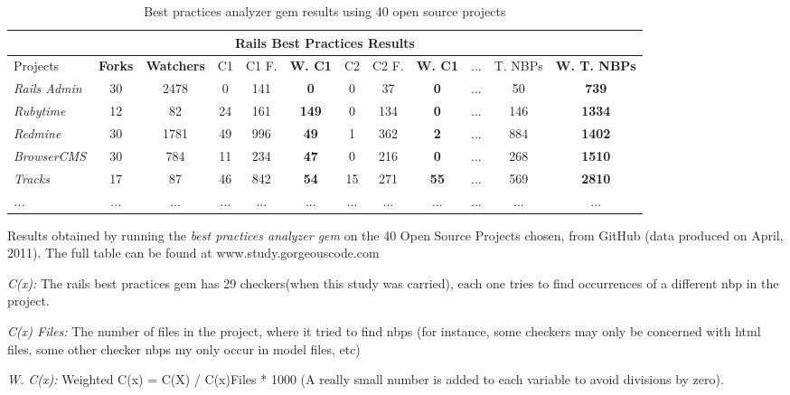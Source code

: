 \begin{table}[H]
\begin{center}
{\scriptsize
\begin{threeparttable}
\begin{tabular}{|l||c|c|c|c|c|c|c|c|c|c|c|} \hline
\multicolumn{12}{|c|}{Rails Best Practices Results} \\ \hline
Projects & \textbf{Forks}         & \textbf{Watchers} & 
C1       & C1 F.                  & \textbf{W. C1} & 
C2       & C2 F.                  & \textbf{W.       C1} & 
...      & T. NBPs                & \textbf{W.  T. NBPs} \\\hline\hline
\emph{Rails Admin } & 30 & 2478 &  0 & 141 & \textbf{  0 }&  0 &  37 & \textbf{ 0} & ...&  50 & \textbf{ 739}  \\ \hline
\emph{Rubytime    } & 12 &   82 & 24 & 161 & \textbf{149 }&  0 & 134 & \textbf{ 0} & ...& 146 & \textbf{1334}  \\ \hline
\emph{Redmine     } & 30 & 1781 & 49 & 996 & \textbf{ 49 }&  1 & 362 & \textbf{ 2} & ...& 884 & \textbf{1402}  \\ \hline
\emph{BrowserCMS  } & 30 &  784 & 11 & 234 & \textbf{ 47 }&  0 & 216 & \textbf{ 0} & ...& 268 & \textbf{1510}  \\ \hline
\emph{Tracks      } & 17 &   87 & 46 & 842 & \textbf{ 54 }& 15 & 271 & \textbf{55} & ...& 569 & \textbf{2810}  \\ \hline
\emph{...}&...&...&...&...&...&...&...&...&...&...&...\\ \hline
\end{tabular} 

\begin{tablenotes}
  \item Results obtained by running the \emph{best practices analyzer gem} on the 40 Open Source Projects chosen, 
        from GitHub (data produced on April, 2011). The full table can be found at www.study.gorgeouscode.com
  \item{ \emph{C(x): }} The rails best practices gem has 29 checkers(when this study was carried), 
                        each one tries to find occurrences of a different nbp in the project. 
  \item{\emph{C(x) Files: }} The number of files in the project, where it tried to find nbps 
                             (for instance, some checkers may only be concerned with html files, 
                             some other checker nbps my only occur in model files, etc)
  \item{\emph{W. C(x): }} Weighted C(x) = C(X) / C(x)Files * 1000 
                          (A really small number is added to each variable to avoid divisions by zero).
\end{tablenotes}
\end{threeparttable}
}
\end{center}
\caption{Best practices analyzer gem results using 40 open source projects}
\end{table}